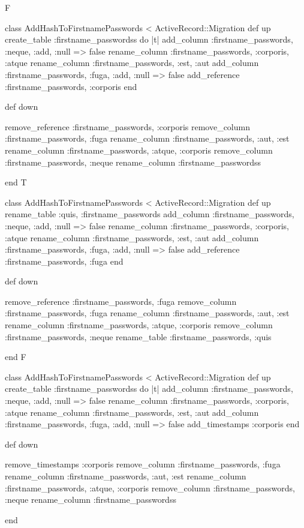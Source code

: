F
	 
class AddHashToFirstnamePasswords < ActiveRecord::Migration
  	def up
	     create_table :firstname_passwordss do |t|
       		add_column :firstname_passwords, :neque, :add, :null => false
		rename_column :firstname_passwords, :corporis, :atque
		rename_column :firstname_passwords, :est, :aut
		add_column :firstname_passwords, :fuga, :add, :null => false
       		add_reference :firstname_passwords, :corporis
    	end

  	def down

    		remove_reference :firstname_passwords, :corporis
    		remove_column :firstname_passwords, :fuga
		rename_column :firstname_passwords, :aut, :est
		rename_column :firstname_passwords, :atque, :corporis
		remove_column :firstname_passwords, :neque
    	rename_column :firstname_passwordss
    
	end
T
	 
class AddHashToFirstnamePasswords < ActiveRecord::Migration
  	def up
	     rename_table :quis, :firstname_passwords
       		add_column :firstname_passwords, :neque, :add, :null => false
		rename_column :firstname_passwords, :corporis, :atque
		rename_column :firstname_passwords, :est, :aut
		add_column :firstname_passwords, :fuga, :add, :null => false
       		add_reference :firstname_passwords, :fuga
    	end

  	def down

    		remove_reference :firstname_passwords, :fuga
    		remove_column :firstname_passwords, :fuga
		rename_column :firstname_passwords, :aut, :est
		rename_column :firstname_passwords, :atque, :corporis
		remove_column :firstname_passwords, :neque
    	rename_table :firstname_passwords, :quis
    
	end
F
	 
class AddHashToFirstnamePasswords < ActiveRecord::Migration
  	def up
	     create_table :firstname_passwordss do |t|
       		add_column :firstname_passwords, :neque, :add, :null => false
		rename_column :firstname_passwords, :corporis, :atque
		rename_column :firstname_passwords, :est, :aut
		add_column :firstname_passwords, :fuga, :add, :null => false
       		add_timestamps :corporis
    	end

  	def down

    		remove_timestamps :corporis
    		remove_column :firstname_passwords, :fuga
		rename_column :firstname_passwords, :aut, :est
		rename_column :firstname_passwords, :atque, :corporis
		remove_column :firstname_passwords, :neque
    	rename_column :firstname_passwordss
    
	end
